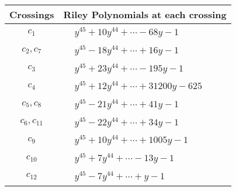 \documentclass[1p]{elsarticle_modified}
\theoremstyle{definition}
\begin{document}
\begin{tabular}{m{50pt}|m{274pt}}
Crossings & \hspace{64pt}Riley Polynomials at each crossing \\
\hline $$\begin{aligned}c_{1}\end{aligned}$$&$\begin{aligned}
&y^{45}+10 y^{44}+\cdots-68 y-1
\end{aligned}$\\
\hline $$\begin{aligned}c_{2},c_{7}\end{aligned}$$&$\begin{aligned}
&y^{45}-18 y^{44}+\cdots+16 y-1
\end{aligned}$\\
\hline $$\begin{aligned}c_{3}\end{aligned}$$&$\begin{aligned}
&y^{45}+23 y^{44}+\cdots-195 y-1
\end{aligned}$\\
\hline $$\begin{aligned}c_{4}\end{aligned}$$&$\begin{aligned}
&y^{45}+12 y^{44}+\cdots+31200 y-625
\end{aligned}$\\
\hline $$\begin{aligned}c_{5},c_{8}\end{aligned}$$&$\begin{aligned}
&y^{45}-21 y^{44}+\cdots+41 y-1
\end{aligned}$\\
\hline $$\begin{aligned}c_{6},c_{11}\end{aligned}$$&$\begin{aligned}
&y^{45}-22 y^{44}+\cdots+34 y-1
\end{aligned}$\\
\hline $$\begin{aligned}c_{9}\end{aligned}$$&$\begin{aligned}
&y^{45}+10 y^{44}+\cdots+1005 y-1
\end{aligned}$\\
\hline $$\begin{aligned}c_{10}\end{aligned}$$&$\begin{aligned}
&y^{45}+7 y^{44}+\cdots-13 y-1
\end{aligned}$\\
\hline $$\begin{aligned}c_{12}\end{aligned}$$&$\begin{aligned}
&y^{45}-7 y^{44}+\cdots+y-1
\end{aligned}$\\
\hline
\end{tabular}\\~\\
\end{document}
